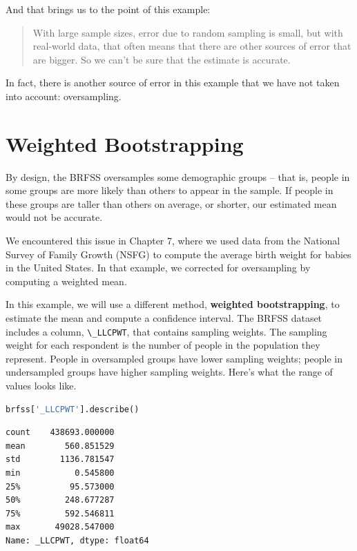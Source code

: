 And that brings us to the point of this example:

\begin{quote}
With large sample sizes, error due to random sampling is small, but with
real-world data, that often means that there are other sources of error
that are bigger. So we can't be sure that the estimate is accurate.
\end{quote}

In fact, there is another source of error in this example that we have
not taken into account: oversampling.

\section{Weighted Bootstrapping}\label{weighted-bootstrapping}

By design, the BRFSS oversamples some demographic groups -- that is,
people in some groups are more likely than others to appear in the
sample. If people in these groups are taller than others on average, or
shorter, our estimated mean would not be accurate.

We encountered this issue in Chapter 7, where we used data from the
National Survey of Family Growth (NSFG) to compute the average birth
weight for babies in the United States. In that example, we corrected
for oversampling by computing a weighted mean.

In this example, we will use a different method, \textbf{weighted
bootstrapping}, to estimate the mean and compute a confidence interval.
The BRFSS dataset includes a column, \passthrough{\lstinline!\_LLCPWT!},
that contains sampling weights. The sampling weight for each respondent
is the number of people in the population they represent. People in
oversampled groups have lower sampling weights; people in undersampled
groups have higher sampling weights. Here's what the range of values
looks like.

\begin{lstlisting}[language=Python,style=source]
brfss['_LLCPWT'].describe()
\end{lstlisting}

\begin{lstlisting}[style=output]
count    438693.000000
mean        560.851529
std        1136.781547
min           0.545800
25%          95.573000
50%         248.677287
75%         592.546811
max       49028.547000
Name: _LLCPWT, dtype: float64
\end{lstlisting}

